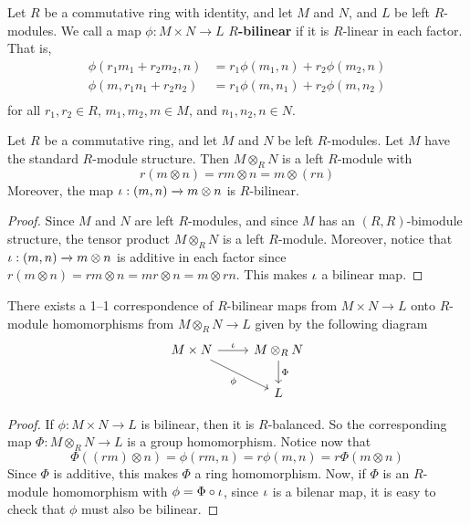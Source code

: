 \begin{definition}
    Let $R$ be a commutative ring with identity, and let $M$ and $N$, and $L$ be
    left $R$-modules. We call a map $\phi:M \times N \xrightarrow{} L$
    \textbf{$R$-bilinear} if it is $R$-linear in each factor. That is,
    \begin{align*}
        \phi(r_1m_1+r_2m_2,n)   &=  r_1\phi(m_1,n)+r_2\phi(m_2,n)   \\
        \phi(m,r_1n_1+r_2n_2)   &=  r_1\phi(m,n_1)+r_2\phi(m,n_2)   \\
    \end{align*}
    for all $r_1,r_2 \in R$, $m_1,m_2,m \in M$, and $n_1,n_2,n \in N$.
\end{definition}

\begin{lemma}\label{4.4.7}
    Let $R$ be a commutative ring, and let $M$ and $N$ be left $R$-modules. Let
    $M$ have the standard $R$-module structure. Then $M \otimes_R N$ is a left
    $R$-module with
    \begin{equation*}
        r(m \otimes n)=rm \otimes n=m \otimes (rn)
    \end{equation*}
    Moreover, the map $\iota:(m,n) \xrightarrow{} m \otimes n$ is $R$-bilinear.
\end{lemma}
\begin{proof}
    Since $M$ and $N$ are left $R$-modules, and since $M$ has an
    $(R,R)$-bimodule structure, the tensor product $M \otimes_R N$ is a left
    $R$-module. Moreover, notice that $\iota:(m,n) \xrightarrow{} m \otimes n$ is
    additive in each factor since $r(m \otimes n)=rm \otimes n=mr \otimes n=m
    \otimes rn$. This makes $\iota$ a bilinear map.
\end{proof}
\begin{corollary}
    There exists a 1--1 correspondence of $R$-bilinear maps from $M \times N
    \xrightarrow{} L$ onto $R$-module homomorphisms from $M \otimes_R N
    \xrightarrow{} L$ given by the following diagram
    \[\begin{tikzcd}
        {M \times N} & {M \otimes_R N} \\
        & L
        \arrow["\iota", from=1-1, to=1-2]
        \arrow["\Phi", from=1-2, to=2-2]
        \arrow["\phi"', from=1-1, to=2-2]
    \end{tikzcd}\]
\end{corollary}
\begin{proof}
    If $\phi:M \times N \xrightarrow{} L$ is bilinear, then it is $R$-balanced.
    So the corresponding map $\Phi:M \otimes_R N \xrightarrow{} L$ is a group
    homomorphism. Notice now that
    \begin{equation*}
        \Phi((rm) \otimes n)=\phi(rm,n)=r\phi(m,n)=r\Phi(m \otimes n)
    \end{equation*}
    Since $\Phi$ is additive, this makes $\Phi$ a ring homomorphism. Now, if
    $\Phi$ is an $R$-module homomorphism with $\phi=\Phi \circ \iota$, since $\iota$
    is a bilenar map, it is easy to check that $\phi$ must also be bilinear.
\end{proof}

